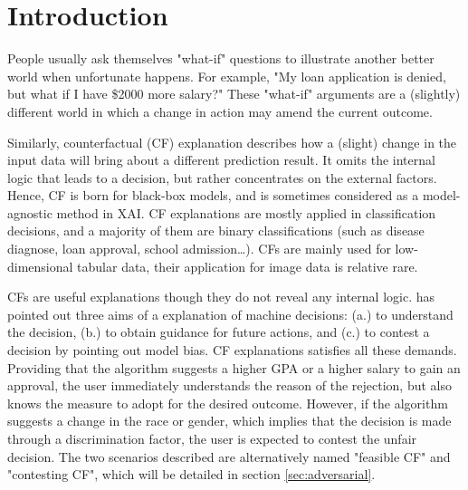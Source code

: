 \section{Introduction}
 People usually ask themselves "what-if" questions to illustrate another better world when unfortunate happens. For example, "My loan application is denied, but what if I have \$2000 more salary?" These "what-if" arguments are a (slightly) different world in which a change in action may amend the current outcome.
 
 Similarly, counterfactual (CF) explanation describes how a (slight) change in the input data will bring about a different prediction result. It omits the internal logic that leads to a decision, but rather concentrates on the external factors. Hence, CF is born for black-box models, and is sometimes considered as a model-agnostic method in XAI. CF explanations are mostly applied in classification decisions, and a majority of them are binary classifications (such as disease diagnose, loan approval, school admission\dots). CFs are mainly used for low-dimensional tabular data, their application for image data is relative rare.

 CFs are useful explanations though they do not reveal any internal logic. \cite{watcher2017} has pointed out three aims of a explanation of machine decisions: (a.) to understand the decision, (b.) to obtain guidance for future actions, and (c.) to contest a decision by pointing out model bias. CF explanations satisfies all these demands. Providing that the algorithm suggests a higher GPA or a higher salary to gain an approval, the user immediately understands the reason of the rejection, but also knows the measure to adopt for the desired outcome. However, if the algorithm suggests a change in the race or gender, which implies that the decision is made through a discrimination factor, the user is expected to contest the unfair decision. The two scenarios described are alternatively named "feasible CF" and "contesting CF", which will be detailed in section \ref{sec:adversarial}.  


